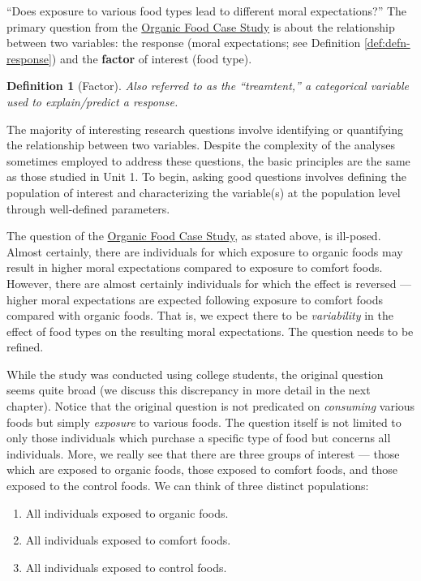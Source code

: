 \documentclass[
]{book}
\providecommand{\tightlist}{%
  \setlength{\itemsep}{0pt}\setlength{\parskip}{0pt}}
\theoremstyle{plain}
\theoremstyle{mydefn}
\newtheorem{definition}{Definition}[chapter]
\theoremstyle{myexmpl}
\theoremstyle{remark}
\begin{document}
``Does exposure to various food types lead to different moral expectations?'' The primary question from the \protect\hyperlink{CaseOrganic}{Organic Food Case Study} is about the relationship between two variables: the response (moral expectations; see Definition \ref{def:defn-response}) and the \textbf{factor} of interest (food type).

\begin{definition}[Factor]
\protect\hypertarget{def:defn-factor}{}{\label{def:defn-factor} {} }Also referred to as the ``treamtent,'' a categorical variable used to explain/predict a response.
\end{definition}

The majority of interesting research questions involve identifying or quantifying the relationship between two variables. Despite the complexity of the analyses sometimes employed to address these questions, the basic principles are the same as those studied in Unit 1. To begin, asking good questions involves defining the population of interest and characterizing the variable(s) at the population level through well-defined parameters.

The question of the \protect\hyperlink{CaseOrganic}{Organic Food Case Study}, as stated above, is ill-posed. Almost certainly, there are individuals for which exposure to organic foods may result in higher moral expectations compared to exposure to comfort foods. However, there are almost certainly individuals for which the effect is reversed --- higher moral expectations are expected following exposure to comfort foods compared with organic foods. That is, we expect there to be \emph{variability} in the effect of food types on the resulting moral expectations. The question needs to be refined.

While the study was conducted using college students, the original question seems quite broad (we discuss this discrepancy in more detail in the next chapter). Notice that the original question is not predicated on \emph{consuming} various foods but simply \emph{exposure} to various foods. The question itself is not limited to only those individuals which purchase a specific type of food but concerns all individuals. More, we really see that there are three groups of interest --- those which are exposed to organic foods, those exposed to comfort foods, and those exposed to the control foods. We can think of three distinct populations:

\begin{enumerate}
\def\labelenumi{\arabic{enumi}.}
\tightlist
\item
  All individuals exposed to organic foods.
\item
  All individuals exposed to comfort foods.
\item
  All individuals exposed to control foods.
\end{enumerate}
\end{document}
